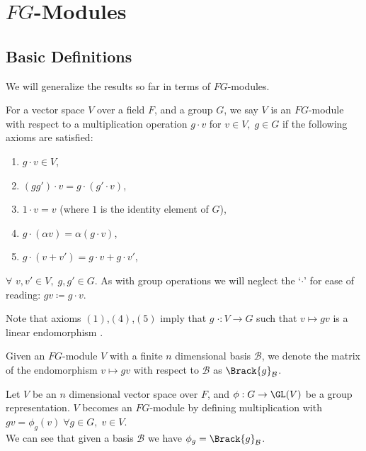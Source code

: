 \documentclass[../Project.tex]{subfiles}
\begin{document}
\newpage
\section{$FG$-Modules}
\subsection{Basic Definitions}
We will generalize the results so far in terms of $FG$-modules.
\begin{defi}
	For a vector space $V$ over a field $F$, and a group $G$, we say $V$ is an $FG$-module with respect to a multiplication operation $g \cdot v$ for $v \in V,\;g \in G$ if the following axioms are satisfied:
	\begin{enumerate}
		\item $g \cdot v \in V$,
		\item $(gg') \cdot v = g \cdot (g' \cdot v)$,
		\item $1 \cdot v = v$ (where $1$ is the identity element of $G$),
		\item $g \cdot (\alpha v) = \alpha(g \cdot v)$,
		\item $g \cdot (v + v') = g\cdot v + g \cdot v'$,
	\end{enumerate}
	$\forall$ $v,v' \in V,\;g,g' \in G$. As with group operations we will neglect the `$\cdot$' for ease of reading: $gv \coloneqq g \cdot v$.
\end{defi}

Note that axioms $(1)$,$(4)$,$(5)$ imply that $g \;\cdot : V \to G$ such that $v \mapsto gv$ is a linear endomorphism \cite{2}.

\begin{defi}
	Given an $FG$-module $V$ with a finite $n$ dimensional basis $\mathcal{B}$, we denote the matrix of the endomorphism $v \mapsto gv$ with respect to $\mathcal{B}$ as $\Brack{g}_\mathcal{B}$.\\
\end{defi}

\begin{theo}[\cite{2}]
	Let $V$ be an $n$ dimensional vector space over $F$, and $\phi : G \to \GL(V)$ be a group representation. $V$ becomes an $FG$-module by defining multiplication with $gv = \phi_g(v) \;\forall g\in G,\;v \in V$.\\

	We can see that given a basis $\mathcal{B}$ we have $\phi_g = \Brack{g}_\mathcal{B}$.
\end{theo}
\end{document}
